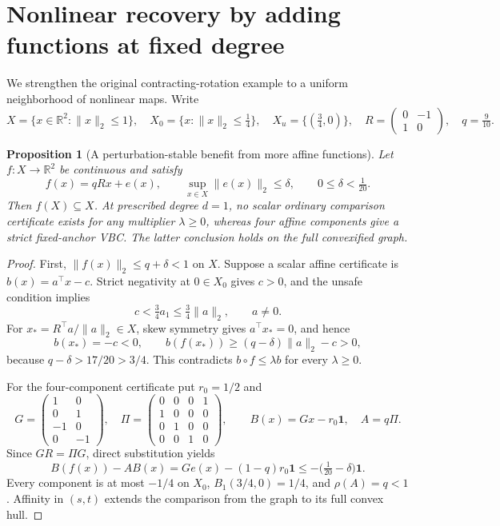 \documentclass[10pt,letterpaper]{article}
\newtheorem{proposition}{Proposition}
\theoremstyle{remark}
\newcommand{\R}{\mathbb R}
\newcommand{\one}{\mathbf 1}
\begin{document}
\section{Nonlinear recovery by adding functions at fixed degree}\label{sec:adding}
We strengthen the original contracting-rotation example to a uniform neighborhood of nonlinear maps. Write
\[
 X=\{x\in\R^2:\|x\|_2\leq1\},\quad
 X_0=\{x:\|x\|_2\leq\tfrac14\},\quad
 X_u=\{(\tfrac34,0)\},\quad
 R=\begin{pmatrix}0&-1\\1&0\end{pmatrix},\quad q=\tfrac9{10}.
\]
\begin{proposition}[A perturbation-stable benefit from more affine functions]\label{prop:nonlinear}
Let $f:X\to\R^2$ be continuous and satisfy
\[
 f(x)=qRx+e(x),\qquad \sup_{x\in X}\|e(x)\|_2\leq\delta,\qquad 0\leq\delta<\tfrac1{20}.
\]
Then $f(X)\subseteq X$. At prescribed degree $d=1$, no scalar ordinary comparison certificate exists for any multiplier $\lambda\geq0$, whereas four affine components give a strict fixed-anchor VBC. The latter conclusion holds on the full convexified graph.
\end{proposition}
\begin{proof}
First, $\|f(x)\|_2\leq q+\delta<1$ on $X$.
Suppose a scalar affine certificate is $b(x)=a^\top x-c$.
Strict negativity at $0\in X_0$ gives $c>0$, and the unsafe condition implies
\[
 c<\tfrac34a_1\leq\tfrac34\|a\|_2,\qquad a\neq0.
\]
For $x_*=R^\top a/\|a\|_2\in X$, skew symmetry gives $a^\top x_*=0$, and hence
\[
 b(x_*)=-c<0,\qquad
 b(f(x_*))\geq(q-\delta)\|a\|_2-c>0,
\]
because $q-\delta>17/20>3/4$. This contradicts
$b\circ f\leq\lambda b$ for every $\lambda\geq0$.

For the four-component certificate put $r_0=1/2$ and
\[
 G=\begin{pmatrix}1&0\\0&1\\-1&0\\0&-1\end{pmatrix},\quad
 \Pi=\begin{pmatrix}0&0&0&1\\1&0&0&0\\0&1&0&0\\0&0&1&0\end{pmatrix},
 \qquad B(x)=Gx-r_0\one,\quad A=q\Pi.
\]
Since $GR=\Pi G$, direct substitution yields
\[
 B(f(x))-AB(x)=Ge(x)-(1-q)r_0\one
 \leq-\bigl(\tfrac1{20}-\delta\bigr)\one.
\]
Every component is at most $-1/4$ on $X_0$, $B_1(3/4,0)=1/4$,
and $\rho(A)=q<1$. Affinity in $(s,t)$ extends the comparison from the graph to its full convex hull.
\end{proof}
\end{document}
